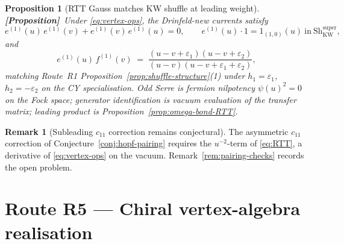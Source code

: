 \documentclass[11pt]{amsart}
\newtheorem{proposition}[theorem]{Proposition}
\theoremstyle{definition}
\newtheorem{remark}[theorem]{Remark}
\providecommand{\ClaimStatusProposition}{\textbf{\textsf{[Proposition]}}}
\begin{document}
\begin{proposition}[RTT Gauss matches KW shuffle at leading weight]
\label{prop:gauss-to-drinfeld-kw}
\ClaimStatusProposition\
Under \eqref{eq:vertex-ops}, the Drinfeld-new currents satisfy
\[
  e^{(1)}(u)\, e^{(1)}(v) + e^{(1)}(v)\, e^{(1)}(u) = 0,
  \qquad
  e^{(1)}(u) \cdot 1 = 1_{(1, 0)}(u)
  \ \text{in}\ \mathrm{Sh}^{\mathrm{super}}_{\mathrm{KW}},
\]
and
\[
  e^{(1)}(u)\, f^{(1)}(v)
  \;=\;
  \frac{(u - v + \varepsilon_1)(u - v + \varepsilon_2)}
       {(u - v)(u - v + \varepsilon_1 + \varepsilon_2)},
\]
matching Route~R1 Proposition~\ref{prop:shuffle-structure}(1) under
$h_1 = \varepsilon_1$, $h_2 = -\varepsilon_2$ on the CY specialisation.
Odd Serre is fermion nilpotency $\psi(u)^2 = 0$ on the Fock space;
generator identification is vacuum evaluation of the transfer matrix;
leading product is Proposition~\ref{prop:omega-bond-RTT}.
\end{proposition}

\begin{remark}[Subleading $c_{11}$ correction remains conjectural]
\label{rem:rtt-subleading-open}
The asymmetric $c_{11}$ correction of Conjecture~\ref{conj:hopf-pairing}
requires the $u^{-2}$-term of \eqref{eq:RTT}, a derivative of
\eqref{eq:vertex-ops} on the vacuum. Remark~\ref{rem:pairing-checks}
records the open problem.
\end{remark}

\section{Route R5 --- Chiral vertex-algebra realisation}
\label{sec:chiral-route}
\end{document}
